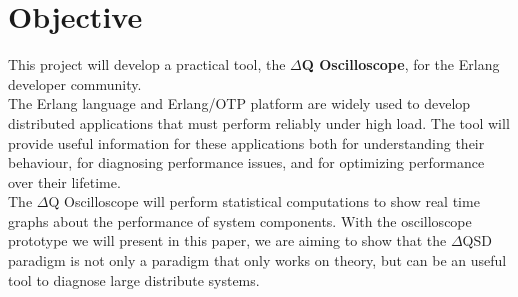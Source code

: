 \section{Objective}
     This project will develop a practical tool, the \textbf{$\Delta$Q Oscilloscope}, for the Erlang developer community. \\
    The Erlang language and Erlang/OTP platform are widely used to develop distributed applications that must perform reliably under high load. The tool will provide useful information for these applications both for understanding their behaviour, for diagnosing performance issues, and for optimizing performance over their lifetime. \\
    The $\Delta$Q Oscilloscope will perform statistical computations to show real time graphs about the performance of system components. With the oscilloscope prototype we will present in this paper, we are aiming to show that the $\Delta$QSD paradigm is not only a paradigm that only works on theory, but can be an useful tool to diagnose large distribute systems.     

